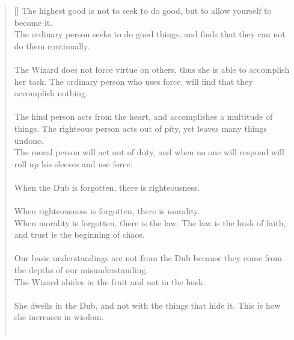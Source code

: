 \documentclass{article}
\begin{document}
\settowidth{\versewidth}{The Wizard leads byemptying people’s minds, filling their bellies, weakening their am- bitions, and making them become strong}
\begin{verse}[\versewidth]
The highest good is not to seek to do good, but to allow yourself to become it.\\
The ordinary person seeks to do good things, and finds that they can not do them continually.\\
\hfill\\
The Wizard does not force virtue on others, thus she is able to accomplish her task. 
The ordinary person who uses force, will find that they accomplish nothing.\\
\hfill\\
The kind person acts from the heart, and accomplishes a multitude of things. 
The righteous person acts out of pity, yet leaves many things undone.\\
The moral person will act out of duty, and when no one will respond will roll up his sleeves and use force.\\
\hfill\\
When the Dub is forgotten, there is righteousness.\\
\hfill\\
When righteousness is forgotten, there is morality.\\
When morality is forgotten, there is the law. 
The law is the husk of faith, and trust is the beginning of chaos.\\
\hfill\\
Our basic understandings are not from the Dub because they come from the depths of our misunderstanding.\\
The Wizard abides in the fruit and not in the husk.\\
\hfill\\
She dwells in the Dub, and not with the things that hide it. 
This is how she increases in wisdom.\\
\hfill\\
\end{verse}
\end{document}
